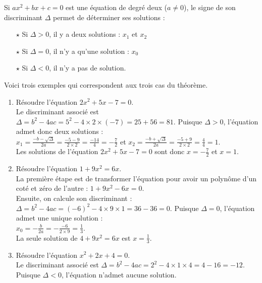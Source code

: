 \documentclass[cours]{lycee-deveaux}
\begin{document}
\begin{propriete}
  \label{propriete-equation}
  Si $ax^2+bx+c=0$ est une équation de degré deux ($a\neq 0$), le signe de son discriminant $\Delta$
  permet de déterminer ses solutions :
  \begin{enumerate}
  \item[$\star$]Si $\Delta > 0$, il y a deux solutions : $x_1$ et $x_2$
  \item[$\star$]Si $\Delta = 0$, il n'y a qu'une solution : $x_0$
  \item[$\star$]Si $\Delta < 0$, il n'y a pas de solution.
  \end{enumerate}
\end{propriete}


\begin{exemple}
  Voici trois exemples qui correspondent aux trois cas du théorème.
  \begin{enumerate}
  \item
    Résoudre l'équation $2x^2+5x-7=0$.\\
    Le discriminant associé est $\Delta = b^2-4ac = 5^2-4\times 2\times (-7) = 25+56 = 81$.
    Puisque $\Delta>0$, l'équation admet donc deux solutions :\\
    $x_1 = \frac{-b-\sqrt{\Delta}}{2a} = \frac{-5-9}{2\times 2} = \frac{-14}{4} = -\frac{7}{2}$
    et $x_2 = \frac{-b+\sqrt{\Delta}}{2a} = \frac{-5+9}{2\times 2} = \frac{4}{4} = 1$.\\
    Les solutions de l'équation $2x^2+5x-7=0$ sont donc $x=-\frac{7}{2}$ et $x=1$.
  \item
    Résoudre l'équation $1+9x^2=6x$.\\
    La première étape est de transformer l'équation pour avoir un polynôme d'un coté et zéro de l'autre :
    $1+9x^2-6x=0$.\\
    Ensuite, on calcule son discriminant : $\Delta = b^2-4ac = (-6)^2-4\times 9\times 1 = 36-36=0$.
    Puisque $\Delta=0$, l'équation admet une unique solution :\\
    $x_0 = -\frac{b}{2a} = -\frac{-6}{2\times 9} = \frac{1}{3}$.\\
    La seule solution de $4+9x^2=6x$ est $x=\frac13$.
  \item
    Résoudre l'équation $x^2+2x+4=0$.\\
    Le discriminant associé est $\Delta = b^2-4ac = 2^2-4\times 1\times 4 = 4-16 = -12$.
    Puisque $\Delta<0$, l'équation n'admet aucune solution.
  \end{enumerate}
\end{exemple}
\end{document}
